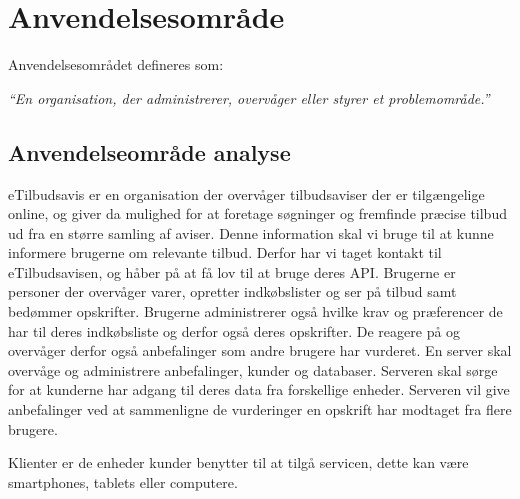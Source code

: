 \section{Anvendelsesområde}
Anvendelsesområdet defineres som:

\textit{``En organisation, der administrerer, overvåger eller styrer et problemområde.''}

\subsection{Anvendelseområde analyse}
eTilbudsavis er en organisation der overvåger tilbudsaviser der er tilgængelige online, og giver da mulighed for at foretage søgninger og fremfinde præcise tilbud ud fra en større samling af aviser.
Denne information skal vi bruge til at kunne informere brugerne om relevante tilbud.
Derfor har vi taget kontakt til eTilbudsavisen, og håber på at få lov til at bruge deres API.
Brugerne er personer der overvåger varer, opretter indkøbslister og ser på tilbud samt bedømmer opskrifter.
Brugerne administrerer også hvilke krav og præferencer de har til deres indkøbsliste og derfor også deres opskrifter.
De reagere på og overvåger derfor også anbefalinger som andre brugere har vurderet.
En server skal overvåge og administrere anbefalinger, kunder og databaser.
Serveren skal sørge  for at kunderne har adgang til deres data fra forskellige enheder.
Serveren vil give anbefalinger ved at sammenligne de vurderinger en opskrift har modtaget fra flere brugere.

Klienter er de enheder kunder benytter til at tilgå servicen, dette kan være smartphones, tablets eller computere.

